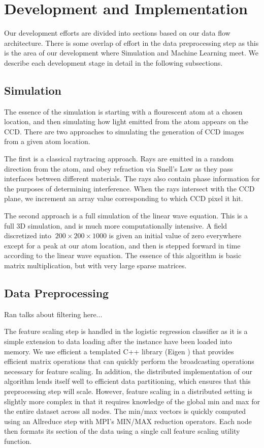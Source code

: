 \section{Development and Implementation}

Our development efforts are divided into sections based on our data flow architecture.  There is some overlap of effort in the data preprocessing step as this is the area of our development where Simulation and Machine Learning meet.  We describe each development stage in detail in the following subsections.

\subsection{Simulation}
The essence of the simulation is starting with a flourescent atom at a chosen location, and then simulating how light emitted from the atom appears on the CCD. There are two approaches to simulating the generation of CCD images from a given atom location.

The first is a classical raytracing approach. Rays are emitted in a random direction from the atom, and obey refraction via Snell's Law as they pass interfaces between different materials. The rays also contain phase information for the purposes of determining interference. When the rays intersect with the CCD plane, we increment an array value corresponding to which CCD pixel it hit.

The second approach is a full simulation of the linear wave equation. This is a full 3D simulation, and is much more computationally intensive. A field discretized into $~200\times 200\times 1000$ is given an initial value of zero everywhere except for a peak at our atom location, and then is stepped forward in time according to the linear wave equation. The essence of this algorithm is basic matrix multiplication, but with very large sparse matrices.

\subsection{Data Preprocessing}

Ran talks about filtering here...

The feature scaling step is handled in the logistic regression classifier as it is a simple extension to data loading after the instance have been loaded into memory.  We use efficient a templated C++ library (Eigen \cite{Eigen}) that provides efficient matrix operations that can quickly perform the broadcasting operations necessary for feature scaling.  In addition, the distributed implementation of our algorithm lends itself well to efficient data partitioning, which ensures that this preprocessing step will scale.  However, feature scaling in a distributed setting is slightly more complex in that it requires knowledge of the global min and max for the entire dataset across all nodes.  The min/max vectors is quickly computed using an Allreduce step with MPI's MIN/MAX reduction operators. Each node then formats its section of the data using a single call feature scaling utility function.

